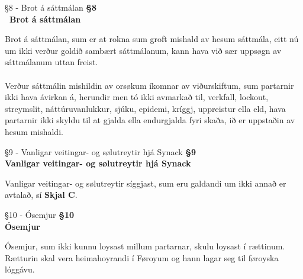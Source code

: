 \begin{center}
	 {§8 - Brot á sáttmálan}
	\textbf{ §8 \\ Brot á sáttmálan}
\end{center}
Brot á sáttmálan, sum er at rokna sum groft mishald av hesum sáttmála, eitt nú um ikki verður goldið sambært sáttmálanum, kann hava við sær uppsøgn av sáttmálanum uttan freist. \\ \\
Verður sáttmálin mishildin av orsøkum íkomnar av viðurskiftum, sum partarnir ikki hava ávirkan á, herundir men tó ikki avmarkað til, verkfall, lockout, streymslit, náttúruvanlukkur, sjúku, epidemi, kríggj, uppreistur ella eld, hava partarnir ikki skyldu til at gjalda ella endurgjalda fyri skaða, ið er uppstaðin av hesum mishaldi.

\begin{center}
	 {§9 - Vanligar veitingar- og sølutreytir hjá Synack}
	\textbf{§9 \\ Vanligar veitingar- og sølutreytir hjá Synack} \\
\end{center}
Vanligar veitingar- og sølutreytir síggjast, sum eru galdandi um ikki annað er avtalað, sí \textbf{Skjal C}.

\begin{center}
	 {§10 - Ósemjur}
	\textbf{§10 \\ Ósemjur}
\end{center}
Ósemjur, sum ikki kunnu loysast millum partarnar, skulu loysast í rættinum. Rætturin skal vera heimahoyrandi í Føroyum og hann lagar seg til føroyska lóggávu.

\newpage
